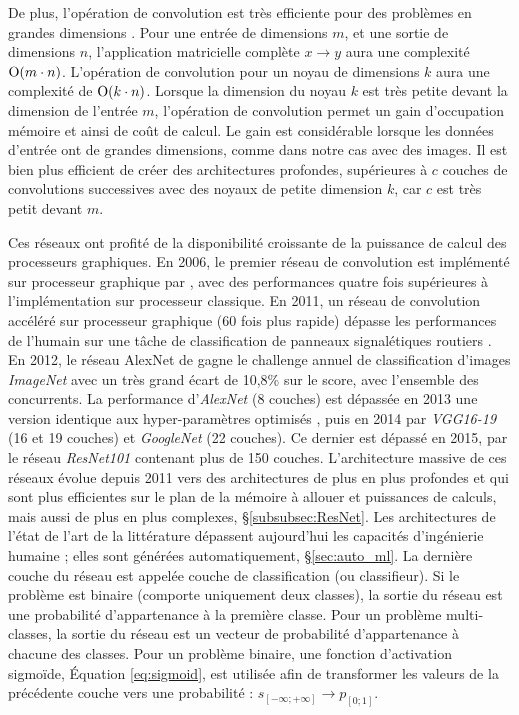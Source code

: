 De plus, l'opération de convolution est très efficiente pour des problèmes en grandes dimensions \cite{goodfellow_deep_2016}.
Pour une entrée de dimensions $m$, et une sortie de dimensions $n$, l'application matricielle complète $x \rightarrow y$ aura une complexité $\operatorname{O}(m \cdot n)$.
L'opération de convolution pour un noyau de dimensions $k$ aura une complexité de $\operatorname{O}(k \cdot n)$.
Lorsque la dimension du noyau $k$ est très petite devant la dimension de l'entrée $m$, l'opération de convolution permet un gain d'occupation mémoire et ainsi de coût de calcul.
Le gain est considérable lorsque les données d'entrée ont de grandes dimensions, comme dans notre cas avec des images.
Il est bien plus efficient de créer des architectures profondes, supérieures à $c$ couches de convolutions successives avec des noyaux de petite dimension $k$, car $c$ est très petit devant $m$.

Ces réseaux ont profité de la disponibilité croissante de la puissance de calcul des processeurs graphiques.
En 2006, le premier réseau de convolution est implémenté sur processeur graphique par \citeauthor{chellapilla_high_2006} \cite{chellapilla_high_2006}, avec des performances quatre fois supérieures à l'implémentation sur processeur classique.
En 2011, un réseau de convolution accéléré sur processeur graphique (60 fois plus rapide) dépasse les performances de l'humain sur une tâche de classification de panneaux signalétiques routiers \cite{ciresan_flexible_2011}.
En 2012, le réseau AlexNet de \citeauthor{krizhevsky_imagenet_2012} \cite{krizhevsky_imagenet_2012} gagne le challenge annuel de classification d'images \textit{ImageNet} \cite{deng_imagenet_2009} avec un très grand écart de 10,8\% sur le score, avec l'ensemble des concurrents.
La performance d'\textit{AlexNet} (8 couches) est dépassée en 2013 une version identique aux hyper-paramètres optimisés \cite{zeiler_visualizing_2013}, puis en 2014 par \textit{VGG16-19} (16 et 19 couches) \cite{simonyan_very_2014}  et \textit{GoogleNet} (22 couches).
Ce dernier est dépassé en 2015, par le réseau \textit{ResNet101} \cite{he_deep_2015} contenant plus de 150 couches.
L'architecture massive de ces réseaux évolue depuis 2011 vers des architectures de plus en plus profondes \cite{he_deep_2015} et qui sont plus efficientes sur le plan de la mémoire à allouer et puissances de calculs, mais aussi de plus en plus complexes, §\ref{subsubsec:ResNet}.
Les architectures de l'état de l'art de la littérature dépassent aujourd'hui les capacités d'ingénierie humaine ; elles sont générées automatiquement, §\ref{sec:auto_ml}.
La dernière couche du réseau est appelée couche de classification (ou classifieur).
Si le problème est binaire (comporte uniquement deux classes), la sortie du réseau est une probabilité d'appartenance à la première classe.
Pour un problème multi-classes, la sortie du réseau est un vecteur de probabilité d'appartenance à chacune des classes.
Pour un problème binaire, une fonction d'activation sigmoïde, Équation \ref{eq:sigmoid}, est utilisée afin de transformer les valeurs de la précédente couche vers une probabilité : $s_{[-\infty; +\infty]} \to p_{[0 ; 1]}$.

